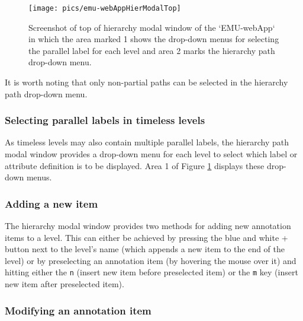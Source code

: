\documentclass[
]{book}
\begin{document}
\begin{figure}

{\centering \texttt{[image: pics/emu-webAppHierModalTop]} 

}

\caption{Screenshot of top of hierarchy modal window of the `EMU-webApp` in which the area marked 1 shows the drop-down menus for selecting the parallel label for each level and area 2 marks the hierarchy path drop-down menu.}\label{fig:webApp-hierModalTop}
\end{figure}

It is worth noting that only non-partial paths can be selected in the hierarchy path drop-down menu.

\hypertarget{selecting-parallel-labels-in-timeless-levels}{%
\subsubsection*{Selecting parallel labels in timeless levels}\label{selecting-parallel-labels-in-timeless-levels}}

As timeless levels may also contain multiple parallel labels, the hierarchy path modal window provides a drop-down menu for each level to select which label or attribute definition is to be displayed. Area 1 of Figure \ref{fig:webApp-hierModalTop} displays these drop-down menus.

\hypertarget{adding-a-new-item}{%
\subsubsection*{Adding a new item}\label{adding-a-new-item}}

The hierarchy modal window provides two methods for adding new annotation items to a level. This can either be achieved by pressing the blue and white + button next to the level's name (which appends a new item to the end of the level) or by preselecting an annotation item (by hovering the mouse over it) and hitting either the \texttt{n} (insert new item before preselected item) or the \texttt{m} key (insert new item after preselected item).

\hypertarget{modifying-an-annotation-item}{%
\subsubsection*{Modifying an annotation item}\label{modifying-an-annotation-item}}
\end{document}

